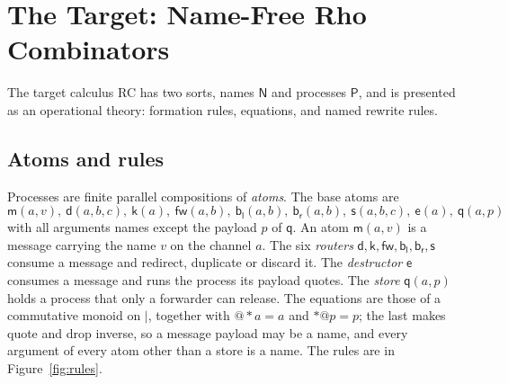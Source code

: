 \documentclass[acmsmall,screen,review,anonymous]{acmart}
\makeatletter
\newcommand{\quo}[1]{@#1}
\newcommand{\drp}[1]{{*}#1}
\newcommand{\mm}{\mathsf{m}}
\newcommand{\dd}{\mathsf{d}}
\newcommand{\kk}{\mathsf{k}}
\newcommand{\fw}{\mathsf{fw}}
\newcommand{\bl}{\mathsf{b}_{\mathsf{l}}}
\newcommand{\br}{\mathsf{b}_{\mathsf{r}}}
\newcommand{\sy}{\mathsf{s}}
\newcommand{\ev}{\mathsf{e}}
\newcommand{\qq}{\mathsf{q}}
\newcommand{\rc}{\textsc{RC}}
\makeatother
\begin{document}
\section{The Target: Name-Free Rho Combinators}
\label{sec:target}

The target calculus \rc{} has two sorts, names $\mathsf{N}$ and processes
$\mathsf{P}$, and is presented as an operational theory: formation rules,
equations, and named rewrite rules.

\subsection{Atoms and rules}

Processes are finite parallel compositions of \emph{atoms}. The base atoms are
\[
  \mm(a,v),\ \dd(a,b,c),\ \kk(a),\ \fw(a,b),\ \bl(a,b),\ \br(a,b),\
  \sy(a,b,c),\ \ev(a),\ \qq(a,p)
\]
with all arguments names except the payload $p$ of $\qq$. An atom $\mm(a,v)$
is a message carrying the name $v$ on the channel $a$. The six \emph{routers}
$\dd,\kk,\fw,\bl,\br,\sy$ consume a message and redirect, duplicate or
discard it. The \emph{destructor} $\ev$ consumes a message and runs the
process its payload quotes. The \emph{store} $\qq(a,p)$ holds a process that
only a forwarder can release. The equations are those of a commutative monoid
on $\mid$, together with $\quo{\drp{a}} = a$ and $\drp{\quo{p}} = p$; the
last makes quote and drop inverse, so a message payload may be a name, and
every argument of every atom other than a store is a name. The rules are
in Figure~\ref{fig:rules}.
\end{document}
